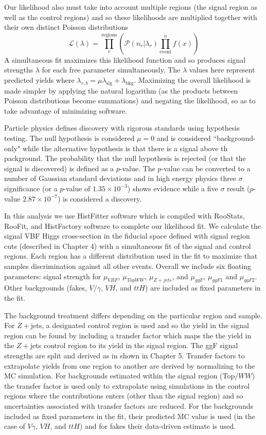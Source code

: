 Our likelihood also must take into account multiple regions (the signal region as well as the control regions) and so these likelihoods are multiplied together with their own distinct Poisson distributions
\begin{equation}
\mathcal{L}(\lambda)=\prod_r^{\text{regions}}(\mathcal{P}(n_r|\lambda_r)\prod_{\text{event}}^n f(x))
\end{equation}
A simultaneous fit maximizes this likelihood function and so produces signal strengths $\lambda$ for each free parameter simultaneously. The $\lambda$ values here represent predicted yields where $\lambda_{r,b} = \mu \lambda_{\text{sig}}+\lambda_{\text{bkg}}$. Maximizing the overall likelihood is made simpler by applying the natural logarithm (as the products between Poisson distributions become summations) and negating the likelihood, so as to take advantage of minimizing software.  

Particle physics defines discovery with rigorous standards using hypothesis testing. The null hypothesis is considered $\mu=0$ and is considered ``background-only" while the alternative hypothesis is that there is a signal above th packground. The probability that the null hypothesis is rejected (or that the signal is discovered) is defined as a $p$-value. The $p$-value can be converted to a number of Gaussian standard deviations and in high energy physics three $\sigma$ significance (or a $p$-value of $1.35 \times 10^{-3}$) shows evidence while a five $\sigma$ result ($p$-value $2.87\times10^{-7}$) is considered a discovery.

In this analysis we use HistFitter software which is compiled with RooStats, RooFit, and HistFactory software to complete our likelihood fit. We calculate the signal VBF Higgs cross-section in the fiducial space defined with signal region cuts (described in Chapter 4) with a simultaneous fit of the signal and control regions. Each region has a different distribution used in the fit to maximize that samples discrimination against all other events. Overall we include six floating parameters: signal strength for $\mu_{VBF}$, $\mu_{TopWW}$, $\mu_{Z+jets}$, and $\mu_{ggF}$, $\mu_{ggF1}$ and $\mu_{ggF2}$. Other backgrounds (fakes, $V/\gamma$, $VH$, and $ttH$) are included as fixed parameters in the fit. 

The background treatment differs depending on the particular region and sample. For $Z+$jets, a designated control region is used and so the yield in the signal region can be found by including a transfer factor which maps the the yield in the $Z+$jets control region to its yield in the signal region. The ggF signal strengths are split and derived as in shown in Chapter 5. Transfer factors to extrapolate yields from one region to another are derived by normalizing to the MC simulation. For backgrounds estimated within the signal region (Top/$WW$) the transfer factor is used only to extrapolate using simulations in the control regions where the contributions enters (other than the signal region) and so uncertainties associated with transfer factors are reduced. For the backgrounds included as fixed parameters in the fit, their predicted MC value is used (in the case of $V\gamma$, $VH$, and $ttH$) and for fakes their data-driven estimate is used. 

